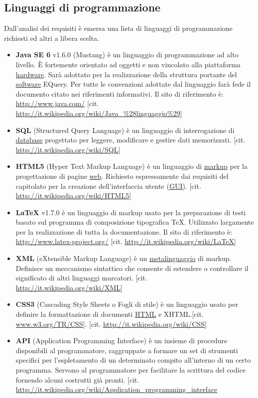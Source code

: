 \documentclass[a4paper,11pt]{article}
\begin{document}
\subsection{Linguaggi di programmazione}
Dall'analisi dei requisiti \`e emersa una lista di linguaggi di programmazione richiesti ed altri a libera scelta.
\begin{itemize}
\item \textbf{Java SE 6} v1.6.0 (Mustang) \`e un linguaggio di programmazione ad alto livello. \`E fortemente orientato ad oggetti e non vincolato alla piattaforma \underline{hardware}. Sar\`a adottato per la realizzazione della struttura portante del \underline{software} EQuery. Per tutte le convenzioni adottate dal linguaggio far\`a fede il documento citato nei riferimenti informativi. Il sito di riferimento \`e:
\url{http://www.java.com/} [cit. \url{http://it.wikipedia.org/wiki/Java_%28linguaggio%29}]
\item \textbf{SQL} (Structured Query Language) \`e un linguaggio di interrogazione di \underline{database} progettato per leggere, modificare e gestire dati memorizzati.
[cit. \url{http://it.wikipedia.org/wiki/SQL}] 
\item \textbf{HTML5} (Hyper Text Markup Language) \`e un linguaggio di \underline{markup} per la progettazione di pagine \underline{web}. Richiesto espressamente dai requisiti del capitolato per la creazione dell'interfaccia utente (\underline{GUI}). [cit. \url{http://it.wikipedia.org/wiki/HTML5}]
\item \textbf{\LaTeX} v1.7.0 \`e  un linguaggio di markup usato per la preparazione di testi basato sul programma di composizione tipografica \TeX. Utilizzato largamente per la realizzazione di tutta la documentazione. Il sito di riferimento \`e: \\
\url{http://www.latex-project.org/}
[cit. \url{http://it.wikipedia.org/wiki/LaTeX}]
\item \textbf{XML} (eXtensible Markup Language) \`e un \underline{metalinguaggio} di markup. Definisce un meccanismo sintattico che consente di estendere o controllare il significato di altri linguaggi marcatori. [cit. \url{http://it.wikipedia.org/wiki/XML}]
\item \textbf{CSS3} (Cascading Style Sheets o Fogli di stile) \`e un linguaggio usato per definire la formattazione di documenti \underline{HTML} e XHTML.[cit. \url{www.w3.org/TR/CSS}].
[cit. \url{http://it.wikipedia.org/wiki/CSS}]
\item \textbf{API} (Application Programming Interface) \`e un insieme di procedure disponibili al programmatore, raggruppate a formare un set di strumenti specifici per l'espletamento di un determinato compito all'interno di un certo programma. Servono al programmatore per facilitare la scrittura del codice fornendo alcuni costrutti gi\`a pronti. [cit. \url{http://it.wikipedia.org/wiki/Application_programming_interface}

\end{itemize}
\end{document}
